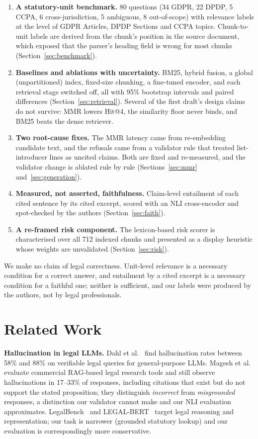 \documentclass[conference]{IEEEtran}
\begin{document}
\begin{enumerate}
\item \textbf{A statutory-unit benchmark.} 80 questions (34 GDPR, 22 DPDP, 5 CCPA, 6 cross-jurisdiction, 5 ambiguous, 8 out-of-scope) with relevance labels at the level of GDPR Articles, DPDP Sections and CCPA topics. Chunk-to-unit labels are derived from the chunk's position in the source document, which exposed that the parser's heading field is wrong for most chunks (Section~\ref{sec:benchmark}).
\item \textbf{Baselines and ablations with uncertainty.} BM25, hybrid fusion, a global (unpartitioned) index, fixed-size chunking, a fine-tuned encoder, and each retrieval stage switched off, all with 95\% bootstrap intervals and paired differences (Section~\ref{sec:retrieval}). Several of the first draft's design claims do not survive: MMR lowers Hit@4, the similarity floor never binds, and BM25 beats the dense retriever.
\item \textbf{Two root-cause fixes.} The MMR latency came from re-embedding candidate text, and the refusals came from a validator rule that treated list-introducer lines as uncited claims. Both are fixed and re-measured, and the validator change is ablated rule by rule (Sections~\ref{sec:mmr} and~\ref{sec:generation}).
\item \textbf{Measured, not asserted, faithfulness.} Claim-level entailment of each cited sentence by its cited excerpt, scored with an NLI cross-encoder and spot-checked by the authors (Section~\ref{sec:faith}).
\item \textbf{A re-framed risk component.} The lexicon-based risk scorer is characterised over all 712 indexed chunks and presented as a display heuristic whose weights are unvalidated (Section~\ref{sec:risk}).
\end{enumerate}

We make no claim of legal correctness. Unit-level relevance is a necessary condition for a correct answer, and entailment by a cited excerpt is a necessary condition for a faithful one; neither is sufficient, and our labels were produced by the authors, not by legal professionals.

\section{Related Work}
\textbf{Hallucination in legal LLMs.} Dahl et al.~\cite{dahl2024fictions} find hallucination rates between 58\% and 88\% on verifiable legal queries for general-purpose LLMs. Magesh et al.~\cite{magesh2024hallucination} evaluate commercial RAG-based legal research tools and still observe hallucinations in 17--33\% of responses, including citations that exist but do not support the stated proposition; they distinguish \emph{incorrect} from \emph{misgrounded} responses, a distinction our validator cannot make and our NLI evaluation approximates. LegalBench~\cite{guha2023legalbench} and LEGAL-BERT~\cite{chalkidis2020legalbert} target legal reasoning and representation; our task is narrower (grounded statutory lookup) and our evaluation is correspondingly more conservative.
\end{document}
